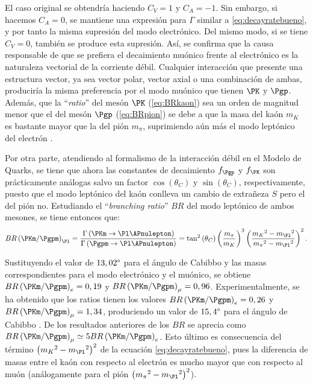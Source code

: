 El caso original se obtendría haciendo $C_{V}=1$ y $C_{A}=-1$. Sin embargo, si hacemos $C_{A}=0$, se mantiene una expresión para $\Gamma$ similar a \ref{eq:decayratebueno}, y por tanto la misma supresión del modo electrónico. Del mismo modo, si se tiene $C_{V}=0$, también se produce esta supresión. Así, se confirma que la causa responsable de que se prefiera el decaimiento muónico frente al electrónico es la naturaleza vectorial de la corriente débil. Cualquier interacción que presente una estructura vector, ya sea vector polar, vector axial o una combinación de ambas, produciría la misma preferencia por el modo muónico que tienen $\PK$ y $\Pgp$. Además, que la ``\textit{ratio}'' del mesón $\PK$ (\ref{eq:BRkaon}) sea un orden de magnitud menor que el del mesón $\Pgp$ (\ref{eq:BRpion}) se debe a que la masa del kaón $m_{K}$ es bastante mayor que la del pión $m_{\pi}$, suprimiendo aún más el modo leptónico del electrón \cite{Renton}.

Por otra parte, atendiendo al formalismo de la interacción débil en el Modelo de Quarks, se tiene que ahora las constantes de decaimiento $f_{\Pgp}$ y $f_{\PK}$ son prácticamente análogas salvo un factor $\cos \left( \theta _{C}\right)$ y $\sin \left( \theta _{C}\right)$, respectivamente, puesto que el modo leptónico del kaón conlleva un cambio de extrañeza $S$ pero el del pión no. Estudiando el ``\textit{branching ratio}'' $BR$ del modo leptónico de ambos mesones, se tiene entonces que:
\begin{equation}
BR\left(\PKm / \Pgpm\right)_{\Pl}=\dfrac{\Gamma \left( \PKm \rightarrow \Pl \APnulepton\right) }{\Gamma \left( \Pgpm \rightarrow \Pl \APnulepton\right)}=\tan ^{2}\left( \theta _{C}\right) \left( \dfrac{m_{\pi}}{m_{K}}\right) ^{3}\left( \dfrac{{m_{K}}^{2}-{m_{\Pl}}^{2}}{{m_{\pi}}^{2}-{m_{\Pl}}^{2}}\right) ^{2} .
\end{equation}

Sustituyendo el valor de $13,02\degree$ para el ángulo de Cabibbo y las masas correspondientes para el modo electrónico y el muónico, se obtiene $BR\left(\PKm / \Pgpm\right)_{e}=0,19$ y $BR\left(\PKm / \Pgpm\right)_{\mu}=0,96$. Experimentalmente, se ha obtenido que los ratios tienen los valores $BR\left(\PKm / \Pgpm\right)_{e}=0,26$ y $BR\left(\PKm / \Pgpm\right)_{\mu}=1,34$, produciendo un valor de  $15,4\degree$ para el ángulo de Cabibbo \cite{Griffiths2008}. De los resultados anteriores de los $BR$ se aprecia como $BR\left(\PKm / \Pgpm\right)_{{\mu}} \simeq 5 BR\left(\PKm / \Pgpm\right)_{e}$. Esto último es consecuencia del término $\left({m_{K}}^{2}-{m_{\Pl}}^{2}\right)^{2}$ de la ecuación \ref{eq:decayratebueno}, pues la diferencia de masas entre el kaón con respecto al electrón es mucho mayor que con respecto al muón (análogamente para el pión $\left({m_{\pi}}^{2}-{m_{\Pl}}^{2}\right)^{2}$). 

